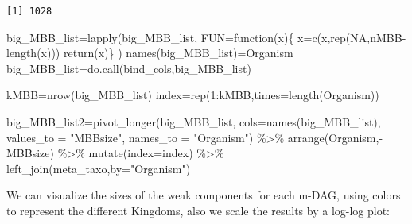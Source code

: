\documentclass[
  letterpaper,
  DIV=11,
  numbers=noendperiod]{scrreprt}
\newenvironment{Shaded}{}{}
\newcommand{\AttributeTok}[1]{\textcolor[rgb]{0.78,0.47,0.87}{#1}}
\newcommand{\ConstantTok}[1]{\textcolor[rgb]{0.82,0.60,0.40}{#1}}
\newcommand{\ControlFlowTok}[1]{\textcolor[rgb]{0.78,0.47,0.87}{#1}}
\newcommand{\DecValTok}[1]{\textcolor[rgb]{0.82,0.60,0.40}{#1}}
\newcommand{\FunctionTok}[1]{\textcolor[rgb]{0.38,0.69,0.94}{#1}}
\newcommand{\NormalTok}[1]{\textcolor[rgb]{0.67,0.70,0.75}{#1}}
\newcommand{\OtherTok}[1]{\textcolor[rgb]{0.15,0.68,0.38}{#1}}
\newcommand{\SpecialCharTok}[1]{\textcolor[rgb]{0.34,0.71,0.76}{#1}}
\newcommand{\StringTok}[1]{\textcolor[rgb]{0.60,0.76,0.47}{#1}}
\begin{document}
\begin{verbatim}
[1] 1028
\end{verbatim}

\begin{Shaded}
\begin{Highlighting}[]
\NormalTok{big\_MBB\_list}\OtherTok{=}\FunctionTok{lapply}\NormalTok{(big\_MBB\_list,}
                    \AttributeTok{FUN=}\ControlFlowTok{function}\NormalTok{(x)\{}
\NormalTok{                      x}\OtherTok{=}\FunctionTok{c}\NormalTok{(x,}\FunctionTok{rep}\NormalTok{(}\ConstantTok{NA}\NormalTok{,nMBB}\SpecialCharTok{{-}}\FunctionTok{length}\NormalTok{(x)))}
                      \FunctionTok{return}\NormalTok{(x)\}}
\NormalTok{)}
\FunctionTok{names}\NormalTok{(big\_MBB\_list)}\OtherTok{=}\NormalTok{Organism}
\NormalTok{big\_MBB\_list}\OtherTok{=}\FunctionTok{do.call}\NormalTok{(bind\_cols,big\_MBB\_list)}

\NormalTok{kMBB}\OtherTok{=}\FunctionTok{nrow}\NormalTok{(big\_MBB\_list)}
\NormalTok{index}\OtherTok{=}\FunctionTok{rep}\NormalTok{(}\DecValTok{1}\SpecialCharTok{:}\NormalTok{kMBB,}\AttributeTok{times=}\FunctionTok{length}\NormalTok{(Organism))}

\NormalTok{big\_MBB\_list2}\OtherTok{=}\FunctionTok{pivot\_longer}\NormalTok{(big\_MBB\_list,}
                           \AttributeTok{cols=}\FunctionTok{names}\NormalTok{(big\_MBB\_list),}
                           \AttributeTok{values\_to =} \StringTok{"MBBsize"}\NormalTok{,}
                           \AttributeTok{names\_to =} \StringTok{"Organism"}\NormalTok{) }\SpecialCharTok{\%\textgreater{}\%} 
  \FunctionTok{arrange}\NormalTok{(Organism,}\SpecialCharTok{{-}}\NormalTok{MBBsize) }\SpecialCharTok{\%\textgreater{}\%}  
  \FunctionTok{mutate}\NormalTok{(}\AttributeTok{index=}\NormalTok{index) }\SpecialCharTok{\%\textgreater{}\%} 
  \FunctionTok{left\_join}\NormalTok{(meta\_taxo,}\AttributeTok{by=}\StringTok{"Organism"}\NormalTok{)}
\end{Highlighting}
\end{Shaded}

We can visualize the sizes of the weak components for each m-DAG, using
colors to represent the different Kingdoms, also we scale the results by
a log-log plot:
\end{document}
